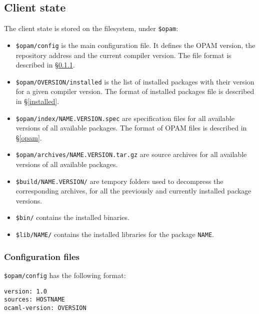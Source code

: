 \documentclass[a4paper,11pt]{article}
\begin{document}
\subsection{Client state}
\label{client}

The client state is stored on the filesystem, under {\tt \$opam}:

\begin{itemize}

\item {\tt \$opam/config} is the main configuration file. It defines
  the OPAM version, the repository address and the current compiler
  version. The file format is described in \S\ref{config}.

\item {\tt \$opam/OVERSION/installed} is the list of installed
  packages with their version for a given compiler version. The format
  of installed packages file is described in \S\ref{installed}.

\item {\tt \$opam/index/NAME.VERSION.spec} are specification files for all
  available versions of all available packages. The format of OPAM
  files is described in \S\ref{opam}.

\item {\tt \$opam/archives/NAME.VERSION.tar.gz} are source archives
  for all available versions of all available packages.

\item {\tt \$build/NAME.VERSION/} are tempory folders used to
  decompress the corresponding archives, for all the previously and
  currently installed package versions.

\item {\tt \$bin/} contains the installed binaries.

\item {\tt \$lib/NAME/} contains the installed libraries for the
  package {\tt NAME}.

\end{itemize}

\subsubsection{Configuration files}
\label{config}

{\tt \$opam/config} has the following format:

\begin{verbatim}
version: 1.0
sources: HOSTNAME
ocaml-version: OVERSION
\end{verbatim}
\end{document}
